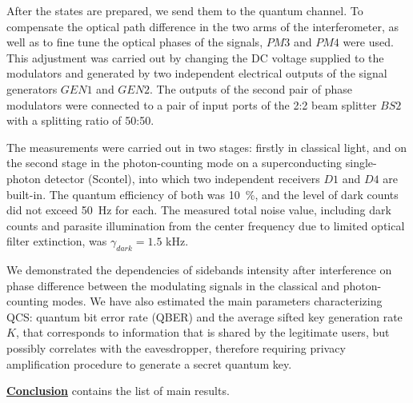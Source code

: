 After the states are prepared, we send them to the quantum channel. To compensate the optical path difference in the two arms of the interferometer, as well as to fine tune the optical phases of the signals, $PM3$ and $PM4$ were used. This adjustment was carried out by changing the DC voltage supplied to the modulators and generated by two independent electrical outputs of the signal generators $GEN1$ and $GEN2$. The outputs of the second pair of phase modulators were connected to a pair of input ports of the 2:2 beam splitter $BS2$ with a splitting ratio of 50:50.

The measurements were carried out in two stages: firstly in classical light, and on the second stage in the photon-counting mode on a superconducting single-photon detector (Scontel), into which two independent receivers $D1$ and $D4$ are built-in. The quantum efficiency of both was 10~\%, and the level of dark counts did not exceed 50~Hz for each. The measured total noise value, including dark counts and parasite illumination from the center frequency due to limited optical filter extinction, was $\gamma_{dark} = 1.5$ kHz.

We demonstrated the dependencies of sidebands intensity after interference on phase difference between the modulating signals in the classical and photon-counting modes. We have also estimated the main parameters characterizing QCS: quantum bit error rate (QBER) and the average sifted key generation rate $ K $, that corresponds to information that is shared by the legitimate users, but possibly correlates with the eavesdropper, therefore requiring privacy amplification procedure to generate a secret quantum key.



 \underline{\textbf{Conclusion}} contains the list of main results. 

  


